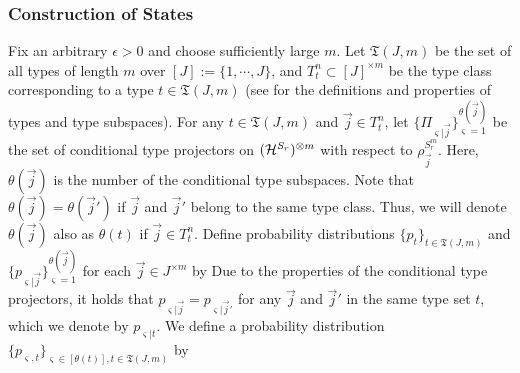 \documentclass[journal]{IEEEtran}
\begin{document}
\begin{lmm}
\begin{lmm}
\subsubsection{Construction of States}

Fix an arbitrary $\epsilon>0$ and choose sufficiently large $m$.
Let $\mathfrak{T}(J,m)$ be the set of all types of length $m$ over $[J]:=\{1,\cdots,J\}$, and $T_t^n\subset [J]^{\times m}$ be the type class corresponding to a type $t\in\mathfrak{T}(J,m)$ (see  for the definitions and properties of types and type subspaces). 
For any $t\in\mathfrak{T}(J,m)$ and $\vec{j}\in T_t^n$, 
let $\{\Pi_{\varsigma|\vec{j}}\}_{\varsigma=1}^{\theta(\vec{j})}$
be the set of conditional type projectors on $({\mathcal H}^{S_r})^{\otimes m}$ with respect to $\rho_{\vec{j}}^{S_r^m}$.
Here, $\theta(\vec{j})$ is the number of the conditional type subspaces.
Note that $\theta(\vec{j})=\theta(\vec{j}')$ if $\vec{j}$ and $\vec{j}'$ belong to the same type class.
Thus, we will denote $\theta(\vec{j})$ also as $\theta(t)$ if $\vec{j}\in T_t^n$. 
Define probability distributions $\{p_t\}_{t\in\mathfrak{T}(J,m)}$ and $\{p_{\varsigma|\vec{j}}\}_{\varsigma=1}^{\theta(\vec{j})}$ for each $\vec{j}\in J^{\times m}$ by
Due to the properties of the conditional type projectors, it holds that $p_{\varsigma|\vec{j}}=p_{\varsigma|\vec{j}'}$ for any $\vec{j}$ and $\vec{j}'$ in the same type set $t$, which we denote by $p_{\varsigma|t}$. 
We define a probability distribution $\{p_{\varsigma,t}\}_{\varsigma\in[\theta(t)],t\in\mathfrak{T}(J,m)}$ by 




\end{lmm}
\end{lmm}
\end{document}
